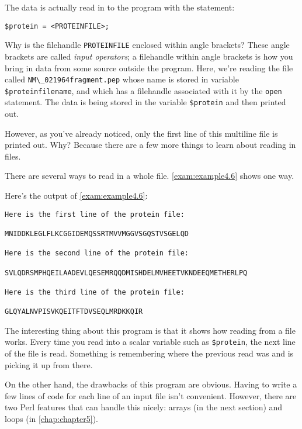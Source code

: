 The data is actually read in to the program with the statement:

\begin{lstlisting}
$protein = <PROTEINFILE>;
\end{lstlisting}

Why is the filehandle \verb|PROTEINFILE| enclosed within angle brackets?  These angle brackets are called \textit{input operators}; a filehandle within angle brackets is how you bring in data from some source outside the program. Here, we're reading the file called \verb|NM\_021964fragment.pep| whose name is stored in variable \verb|$proteinfilename|, and which has a filehandle associated with it by the \verb|open| statement. The data is being stored in the variable \verb|$protein| and then printed out.

However, as you've already noticed, only the first line of this multiline file is printed out. Why? Because there are a few more things to learn about reading in files.

There are several ways to read in a whole file. \autoref{exam:example4.6} shows one way.



Here's the output of \autoref{exam:example4.6}:

\begin{lstlisting}
Here is the first line of the protein file:

MNIDDKLEGLFLKCGGIDEMQSSRTMVVMGGVSGQSTVSGELQD

Here is the second line of the protein file:

SVLQDRSMPHQEILAADEVLQESEMRQQDMISHDELMVHEETVKNDEEQMETHERLPQ

Here is the third line of the protein file:

GLQYALNVPISVKQEITFTDVSEQLMRDKKQIR
\end{lstlisting}

The interesting thing about this program is that it shows how reading from a file works. Every time you read into a scalar variable such as \verb|$protein|, the next line of the file is read. Something is remembering where the previous read was and is picking it up from there.

On the other hand, the drawbacks of this program are obvious. Having to write a few lines of code for each line of an input file isn't convenient. However, there are two Perl features that can handle this nicely: arrays (in the next section) and loops (in \autoref{chap:chapter5}). 

